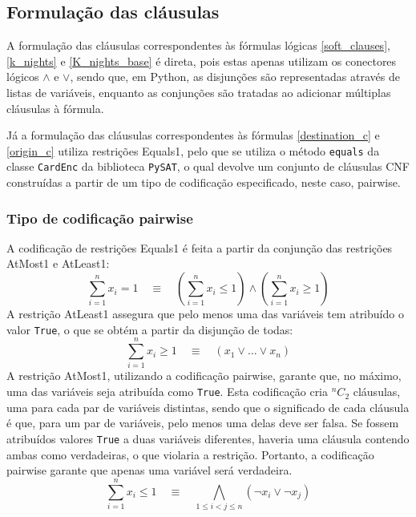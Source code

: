 \documentclass[12pt,a4paper]{article}
\begin{document}
    \subsection{Formulação das cláusulas}
        A formulação das cláusulas correspondentes às fórmulas lógicas \ref{soft_clauses}, \ref{k_nights} e \ref{K_nights_base} é direta, pois estas apenas utilizam os conectores lógicos $\land$ e $\lor$, sendo que, em Python, as disjunções são representadas através de listas de variáveis, enquanto as conjunções são tratadas ao adicionar múltiplas cláusulas à fórmula.

        Já a formulação das cláusulas correspondentes às fórmulas \ref{destination_c} e \ref{origin_c} utiliza restrições Equals1, pelo que se utiliza o método \texttt{equals} da classe \texttt{CardEnc} da biblioteca \texttt{PySAT}, o qual devolve um conjunto de cláusulas CNF construídas a partir de um tipo de codificação especificado, neste caso, pairwise.

    \subsubsection{Tipo de codificação pairwise}
        A codificação de restrições Equals1 é feita a partir da conjunção das restrições AtMost1 e AtLeast1:
        \begin{equation}
            \sum_{i=1}^{n} x_i = 1 \quad \equiv \quad \left( \sum_{i=1}^{n} x_i \leq 1 \right) \land \left( \sum_{i=1}^{n} x_i \geq 1 \right)
        \end{equation}
        A restrição AtLeast1 assegura que pelo menos uma das variáveis tem atribuído o valor \texttt{True}, o que se obtém a partir da disjunção de todas:
        \begin{equation}
            \sum_{i=1}^{n} x_i \geq 1 \quad \equiv \quad \left( x_1 \lor \dots \lor x_n \right)
        \end{equation}
        A restrição AtMost1, utilizando a codificação pairwise, garante que, no máximo, uma das variáveis seja atribuída como \texttt{True}. Esta codificação cria $^nC_2$ cláusulas, uma para cada par de variáveis distintas, sendo que o significado de cada cláusula é que, para um par de variáveis, pelo menos uma delas deve ser falsa. Se fossem atribuídos valores \texttt{True} a duas variáveis diferentes, haveria uma cláusula contendo ambas como verdadeiras, o que violaria a restrição. Portanto, a codificação pairwise garante que apenas uma variável será verdadeira.
        \begin{equation}
            \sum_{i=1}^{n} x_i \leq 1 \quad \equiv \quad \bigwedge_{1 \leq i < j \leq n} \left( \neg x_i \lor \neg x_j \right)
        \end{equation}
\end{document}
